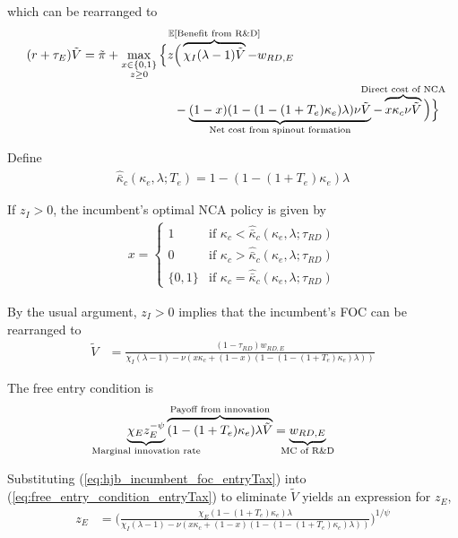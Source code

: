 \documentclass[11pt,english]{article}
\theoremstyle{remark}
\begin{document}
which can be rearranged to
\begin{align}
(r + \tau_E) \tilde{V} = \tilde{\pi} + \max_{\substack{x \in \{0,1\} \\ z \ge 0}} \Big\{z &\Big( \overbrace{\chi_I (\lambda - 1) \tilde{V}}^{\mathclap{\mathbb{E}[\textrm{Benefit from R\&D}]}}- w_{RD,E} \\
&-  \underbrace{(1-x)(1 - (1-(1+T_e)\kappa_{e})\lambda)\nu \tilde{V}}_{\mathclap{\text{Net cost from spinout formation}}} - \overbrace{x \kappa_{c} \nu \tilde{V}}^{\mathclap{\text{Direct cost of NCA}}}\Big) \Big\} \label{eq:hjb_incumbent_entryTax_2}
\end{align}

Define
\begin{align}
\hat{\bar{\kappa}}_c(\kappa_e,\lambda;T_e) = 1 - (1-(1+T_e)\kappa_e)\lambda  \label{eq:barkappa_entryTax}
\end{align} 

If $z_I > 0$, the incumbent's optimal NCA policy is given by 
\begin{align}
x = \begin{cases}
1 & \textrm{if } \kappa_{c} < \hat{\bar{\kappa}}_c (\kappa_e, \lambda;\tau_{RD}) \\
0 & \textrm{if } \kappa_{c} > \hat{\bar{\kappa}}_c (\kappa_e, \lambda;\tau_{RD})\\
\{0,1\} & \textrm{if } \kappa_c = \hat{\bar{\kappa}}_c (\kappa_e, \lambda;\tau_{RD})
\end{cases} \label{eq:nca_policy_entryTax}
\end{align}


By the usual argument, $z_I > 0$ implies that the incumbent's FOC can be rearranged to
\begin{align}
\tilde{V} &= \frac{(1-\tau_{RD})w_{RD,E}}{\chi_I(\lambda -1) - \nu (x\kappa_c + (1-x)(1 - (1-(1+T_e)\kappa_e)\lambda)) } \label{eq:hjb_incumbent_foc_entryTax}
\end{align}

The free entry condition is
\begin{align}
\underbrace{\chi_E z_E^{-\psi}}_{\mathclap{\text{Marginal innovation rate}}} \overbrace{(1-(1+T_e)\kappa_e) \lambda \tilde{V}}^{\mathclap{\text{Payoff from innovation}}} &= \underbrace{w_{RD,E}}_{\mathclap{\text{MC of R\&D}}} \label{eq:free_entry_condition_entryTax}
\end{align}

Substituting (\ref{eq:hjb_incumbent_foc_entryTax}) into (\ref{eq:free_entry_condition_entryTax}) to eliminate $\tilde{V}$ yields an expression for $z_E$, 
\begin{align}
z_E &= \Bigg( \frac{\chi_E (1-(1+T_e)\kappa_{e}) \lambda}{\chi_I(\lambda -1) - \nu (x\kappa_c + (1-x)(1 - (1-(1+T_e)\kappa_e)\lambda)) } \Bigg)^{1/\psi} \label{eq:effort_entrant_entryTax}
\end{align}
\end{document}
